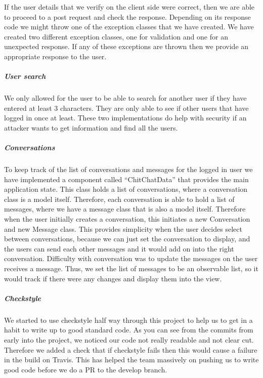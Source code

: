 \documentclass[11pt,a4paper]{report}
\begin{document}
If the user details that we verify on the client side were correct, then we are able to proceed to a post request and check the response. Depending on its response code we might throw one of the exception classes that we have created. We have created two different exception classes, one for validation and one for an unexpected response. If any of these exceptions are thrown then we provide an appropriate response to the user.

\subparagraph{User search}
We only allowed for the user to be able to search for another user if they have entered at least 3 characters. They are only able to see if other users that have logged in once at least. These two implementations do help with security if an attacker wants to get information and find all the users.

\subparagraph{Conversations}
To keep track of the list of conversations and messages for the logged in user we have implemented a component called “ChitChatData” that provides the main application state. This class holds a list of conversations, where a conversation class is a model itself. Therefore, each conversation is able to hold a list of messages, where we have a message class that is also a model itself. Therefore when the user initially creates a conversation, this initiates a new Conversation and new Message class. This provides simplicity when the user decides select between conversations, because we can just set the conversation to display, and the users can send each other messages and it would add on into the right conversation. Difficulty with conversation was to update the messages on the user receives a message. Thus, we set the list of messages to be an observable list, so it would track if there were any changes and display them into the view.

\subparagraph{Checkstyle}
We started to use checkstyle half way through this project to help us to get in a habit to write up to good standard code. As you can see from the commits from early into the project, we noticed our code not really readable and not clear cut. Therefore we added a check that if checkstyle fails then this would cause a failure in the build on Travis. This has helped the team massively on pushing us to write good code before we do a PR to the develop branch.
\end{document}
